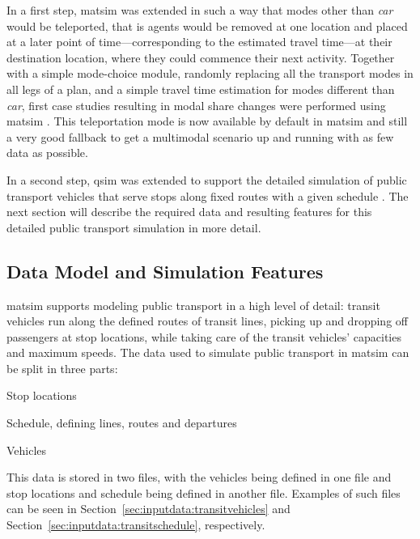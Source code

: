 In a first step, \gls{matsim} was extended in such a way that modes other than
\emph{car} would be teleported, that is agents would be removed at one location
and placed at a later point of time---corresponding to the estimated travel time---at
their destination location, where they could commence their next activity.
Together with a simple mode-choice module, randomly replacing all the
transport modes in all legs of a plan, and a simple travel time estimation for
modes different than \emph{car}, first case studies resulting in modal share
changes were performed using \gls{matsim}
\citep{RieserGretherNagel2008modeChoiceCalculations,
GretherEtAl2009SimpleModeChoiceIPL}. This \gls{teleportation} mode is now available by
default in \gls{matsim} and still a very good fallback to get a \gls{multimodal} scenario
up and running with as few data as possible.

In a second step, \gls{qsim} was extended to support the detailed simulation of
public transport vehicles that serve stops along fixed routes with a given schedule
\citep{Rieser2010}.
The next section will describe the required data and resulting features for this
detailed public transport simulation in more detail.

\subsection{Data Model and Simulation Features}
\gls{matsim} supports modeling public transport in a high level of detail: transit
vehicles run along the defined routes of transit lines, picking up
and dropping off passengers at stop locations, while taking care of the transit
vehicles' capacities and maximum speeds. The data used to simulate public
transport in \gls{matsim} can be split in three parts:
%
\begin{compactitem}
\item Stop locations
\item Schedule, defining lines, routes and departures
\item Vehicles
\end{compactitem}

This data is stored in two files, with the vehicles being defined in one
file and stop locations and schedule being defined in
another file.
Examples of such files can be seen in
Section~\ref{sec:inputdata:transitvehicles} and
Section~\ref{sec:inputdata:transitschedule}, respectively.

